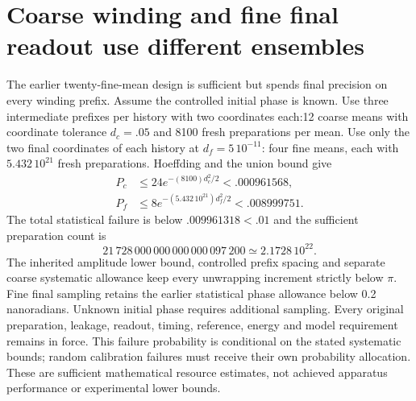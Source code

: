 \section{Coarse winding and fine final readout use different ensembles}
The earlier twenty-fine-mean design is sufficient but spends final
precision on every winding prefix. Assume the controlled initial phase
is known. Use three intermediate prefixes per history with two coordinates
each:12 coarse means with coordinate tolerance $d_c=.05$ and 8100 fresh
preparations per mean. Use only the two final coordinates of each history
at $d_f=5\,10^{-11}$: four fine means, each with
$5.432\,10^{21}$ fresh preparations. Hoeffding and the union bound give
\[
 \begin{aligned}
 P_c&\le 24e^{-(8100)d_c^2/2}<.000961568,\\
 P_f&\le 8e^{-(5.432\,10^{21})d_f^2/2}<.008999751.
 \end{aligned}
\]
The total statistical failure is below $.009961318<.01$ and the sufficient
preparation count is
\[
 21\,728\,000\,000\,000\,000\,097\,200
 \simeq 2.1728\,10^{22}.
\]
The inherited amplitude lower bound, controlled prefix spacing and
separate coarse systematic allowance keep every unwrapping increment
strictly below $\pi$. Fine final sampling retains the earlier statistical
phase allowance below 0.2 nanoradians. Unknown initial phase requires
additional sampling. Every original preparation, leakage, readout,
timing, reference, energy and model requirement remains in force.
This failure probability is conditional on the stated systematic bounds;
random calibration failures must receive their own probability allocation.
These are sufficient mathematical resource estimates, not achieved
apparatus performance or experimental lower bounds.
